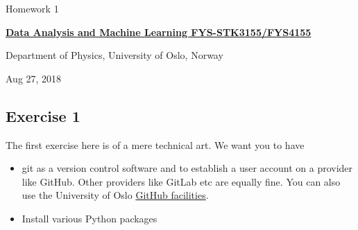 \documentclass[%
oneside,                 %
final,                   %
10pt]{article}
\begin{document}

\newcommand{\exercisesection}[1]{\subsection*{#1}}






\thispagestyle{empty}

\begin{center}
{\LARGE\bf
\begin{spacing}{1.25}
Homework 1
\end{spacing}
}
\end{center}


\begin{center}
{\bf \href{{http://www.uio.no/studier/emner/matnat/fys/FYS3155/index-eng.html}}{Data Analysis and Machine Learning FYS-STK3155/FYS4155}}
\end{center}

    \begin{center}
\centerline{{\small Department of Physics, University of Oslo, Norway}}
\end{center}
    

\begin{center}
Aug 27, 2018
\end{center}

\vspace{1cm}


\subsection{Exercise 1}

The first exercise here is of a mere technical art. We want you to have 
\begin{itemize}
\item git as a version control software and to establish a user account on a provider like GitHub. Other providers like GitLab etc are equally fine. You can also use the University of Oslo \href{{https://www.uio.no/tjenester/it/maskin/filer/versjonskontroll/github.html}}{GitHub facilities}. 

\item Install various Python packages
\end{itemize}
\end{document}
